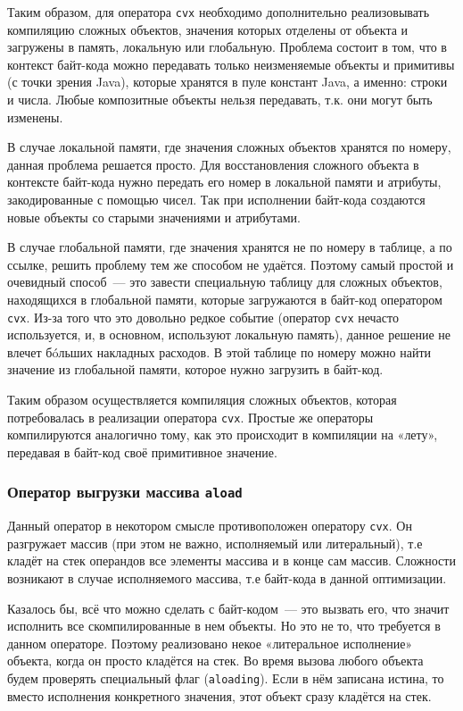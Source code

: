 	Таким образом, для оператора \texttt{cvx} необходимо дополнительно реализовывать  компиляцию сложных объектов, значения которых отделены от объекта и загружены в память, локальную или глобальную. Проблема состоит в том, что в контекст байт-кода можно передавать только неизменяемые объекты и примитивы (с точки зрения Java), которые хранятся в пуле констант Java, а именно: строки и числа. Любые композитные объекты нельзя передавать, т.к. они могут быть изменены.
	
	В случае локальной памяти, где значения сложных объектов хранятся по номеру, данная проблема решается просто. Для восстановления сложного объекта в контексте байт-кода нужно передать его номер в локальной памяти и атрибуты, закодированные с помощью чисел. Так при исполнении байт-кода создаются новые объекты со старыми значениями и атрибутами.
	
	В случае глобальной памяти, где значения хранятся не по номеру в таблице, а по ссылке, решить проблему тем же способом не удаётся. Поэтому самый простой и очевидный способ~--- это завести специальную таблицу для сложных объектов, находящихся в глобальной памяти, которые загружаются в байт-код оператором \texttt{cvx}. Из-за того что это довольно редкое событие (оператор \texttt{cvx} нечасто используется, и, в основном, используют локальную память), данное решение не влечет бóльших накладных расходов. В этой таблице по номеру можно найти значение из глобальной памяти, которое нужно загрузить в байт-код.
	
	Таким образом осуществляется компиляция сложных объектов, которая потребовалась в реализации оператора \texttt{cvx}. Простые же операторы компилируются аналогично тому, как это происходит в компиляции на «лету», передавая в байт-код своё примитивное значение.
	\subsubsection*{Оператор выгрузки массива \texttt{aload}}
	Данный оператор в некотором смысле противоположен оператору \texttt{cvx}. Он разгружает массив (при этом не важно, исполняемый или литеральный), т.е кладёт на стек операндов все элементы массива и в конце сам массив. Сложности возникают в случае исполняемого массива, т.е байт-кода в данной оптимизации.
	
	Казалось бы, всё что можно сделать с байт-кодом~--- это вызвать его, что значит исполнить все скомпилированные в нем объекты. Но это не то, что требуется в данном операторе. Поэтому реализовано некое «литеральное исполнение» объекта, когда он просто кладётся на стек. Во время вызова любого объекта будем проверять специальный флаг (\texttt{aloading}). Если  в нём записана истина, то вместо исполнения конкретного значения, этот объект сразу кладётся на стек.
	
